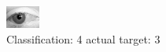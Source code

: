 \begin{figure}[h!]
\begin{center}
\includegraphics[width=0.60\columnwidth]{figures/ID2783_class_4_target_3.png}
\end{center}
\caption{ Classification: 4 actual target: 3}
\label{fig:ID2783_class_4_target_3}
\end{figure}
